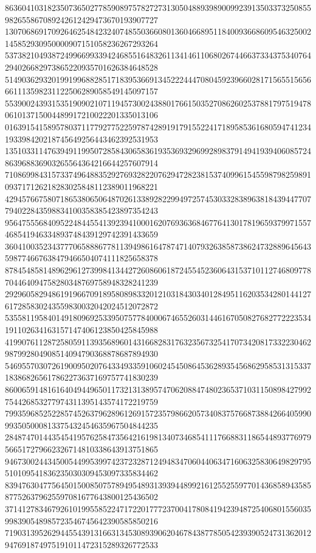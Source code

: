 \begin{DoxyCode}
      863604103182350736502778590897578272731305048893989009923913503373250855982655867089242612429473670193907727
      130706869170926462548423240748550366080136046689511840093668609546325002145852930950000907151058236267293264
      537382104938724996699339424685516483261134146110680267446637334375340764294026682973865220935701626384648528
      514903629320199199688285171839536691345222444708045923966028171565515656661113598231122506289058549145097157
      553900243931535190902107119457300243880176615035270862602537881797519478061013715004489917210022201335013106
      016391541589578037117792775225978742891917915522417189585361680594741234193398420218745649256443462392531953
      135103311476394911995072858430658361935369329699289837914941939406085724863968836903265564364216644257607914
      710869984315733749648835292769328220762947282381537409961545598798259891093717126218283025848112389011968221
      429457667580718653806506487026133892822994972574530332838963818439447707794022843598834100358385423897354243
      956475556840952248445541392394100016207693636846776413017819659379971557468541946334893748439129742391433659
      360410035234377706588867781139498616478747140793263858738624732889645643598774667638479466504074111825658378
      878454858148962961273998413442726086061872455452360643153710112746809778704464094758280348769758948328241239
      292960582948619196670918958089833201210318430340128495116203534280144127617285830243559830032042024512072872
      535581195840149180969253395075778400067465526031446167050827682772223534191102634163157147406123850425845988
      419907611287258059113935689601431668283176323567325417073420817332230462987992804908514094790368878687894930
      546955703072619009502076433493359106024545086453628935456862958531315337183868265617862273637169757741830239
      860065914816164049449650117321313895747062088474802365371031150898427992754426853277974311395143574172219759
      799359685252285745263796289612691572357986620573408375766873884266405990993505000813375432454635967504844235
      284874701443545419576258473564216198134073468541117668831186544893776979566517279662326714810338643913751865
      946730024434500544995399742372328712494834706044063471606325830649829795510109541836235030309453097335834462
      839476304775645015008507578949548931393944899216125525597701436858943585877526379625597081677643800125436502
      371412783467926101995585224717220177723700417808419423948725406801556035998390548985723546745642390585850216
      719031395262944554391316631345308939062046784387785054239390524731362012947691874975191011472315289326772533

\end{DoxyCode}
